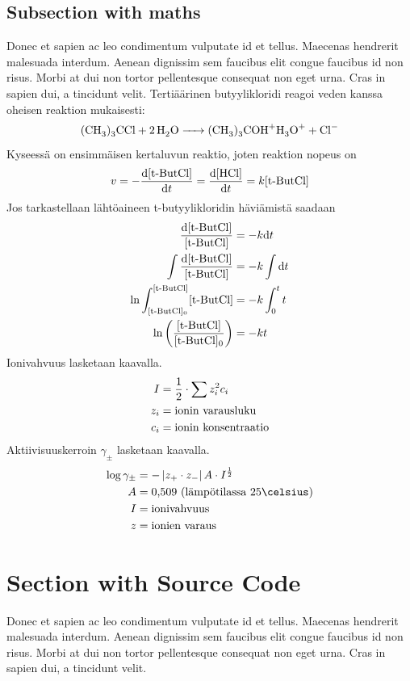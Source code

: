 \documentclass[11pt,a4paper,oneside,article]{memoir}
\newcommand\tn[1]{\textnormal{#1}} %
\newcommand\reaction[1]{\begin{equation}\ce{#1}\end{equation}} %
\begin{document}
\subsection{Subsection with \Gls{maths}}
Donec et sapien ac leo condimentum vulputate id et tellus. Maecenas hendrerit malesuada interdum. Aenean dignissim sem faucibus elit congue faucibus id non risus. Morbi at dui non tortor pellentesque consequat non eget urna. Cras in sapien dui, a tincidunt velit. Tertiäärinen butyylikloridi reagoi veden kanssa oheisen reaktion mukaisesti:
\reaction{(CH3)3CCl + 2H2O -> (CH3)3COH+H3O+ +Cl-}
Kyseessä on ensimmäisen kertaluvun reaktio, joten reaktion nopeus on
\begin{align}
v=-\frac{\mathrm{d}[\tn{t-ButCl}]}{\mathrm{d}t}=\frac{\mathrm{d}[\tn{HCl}]}{\mathrm{d}t}=k[\tn{t-ButCl}]
\end{align}
Jos tarkastellaan lähtöaineen t-butyylikloridin häviämistä saadaan
\begin{align}
\frac{\mathrm{d}[\tn{t-ButCl}]}{[\tn{t-ButCl}]}&=-k\mathrm{d}t \\
\int \frac{\mathrm{d}[\tn{t-ButCl}]}{[\tn{t-ButCl}]}&=-k \int \mathrm{d}t \\
\ln \int_{[\tn{t-ButCl}]_0}^{[\tn{t-ButCl}]} [\tn{t-ButCl}]&=-k\int_0^t t \\
\ln \left( \frac{[\tn{t-ButCl}]}{[\tn{t-ButCl}]_0} \right)&=-kt
\end{align}
Ionivahvuus lasketaan kaavalla.
\begin{align}
I&=\frac{1}{2}\cdot\sum z_i^2c_i \\
z_i&= \tn{ionin varausluku} \\
c_i&= \tn{ionin konsentraatio}
\end{align}
Aktiivisuuskerroin $\gamma_\pm$ lasketaan kaavalla.
\begin{align}
\log \gamma_\pm &= -\left|z_+\cdot z_-\right|A\cdot I^{\frac{1}{2}} \\
A &= \tn{0,509 (lämpötilassa 25\celsius}) \\
I &= \tn{ionivahvuus} \\
z &= \tn{ionien varaus}
\end{align}

\section{Section with Source Code}
Donec et sapien ac leo condimentum vulputate id et tellus. Maecenas hendrerit malesuada interdum. Aenean dignissim sem faucibus elit congue faucibus id non risus. Morbi at dui non tortor pellentesque consequat non eget urna. Cras in sapien dui, a tincidunt velit.
\end{document}
